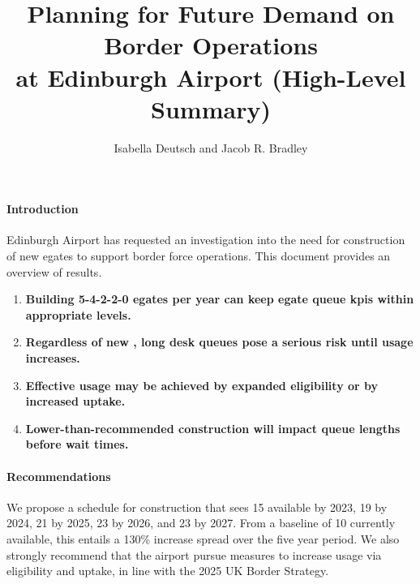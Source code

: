 \documentclass[10pt]{article}
\title{Planning for Future Demand on Border Operations\\ at Edinburgh Airport (High-Level Summary)}
\author{Isabella Deutsch and Jacob R. Bradley}
\date{}
\begin{document}
\maketitle
\thispagestyle{empty}

\vspace{-15pt}
\paragraph{Introduction}
Edinburgh Airport has requested an investigation into the need for construction of new \glspl{egate} to support border force operations. This document provides an overview of results.
\begin{tcolorbox}[
colframe=edi-dark-purple,
colback=edi-light-purple,
fonttitle=\bfseries,
title = {Report Highlights}]
\begin{enumerate}[itemsep=-1ex]
   \vspace{-1.5mm}
    \item \textbf{Building 5-4-2-2-0 \glspl{egate} per year can keep \gls{egate} queue \glspl{kpi} within appropriate levels.}\\
    \vspace{-1.5mm}
    \item \textbf{Regardless of new , long desk queues pose a serious risk until  usage increases.}\\
    \vspace{-1.5mm}
    \item \textbf{Effective  usage may be achieved by expanded eligibility or by increased uptake.}\\
    \vspace{-1.5mm}
    \item \textbf{Lower-than-recommended  construction will impact queue lengths before wait times.}
    \vspace{-1.5mm}
\end{enumerate}
\end{tcolorbox}
\paragraph{Recommendations}
We propose a schedule for  construction that sees 15  available by 2023, 19 by 2024, 21 by 2025, 23 by 2026, and 23 by 2027. From a baseline of 10  currently available, this entails a 130\% increase spread over the five year period. We also strongly recommend that the airport pursue measures to increase  usage via eligibility and uptake, in line with the 2025 UK Border Strategy. 
\end{document}
